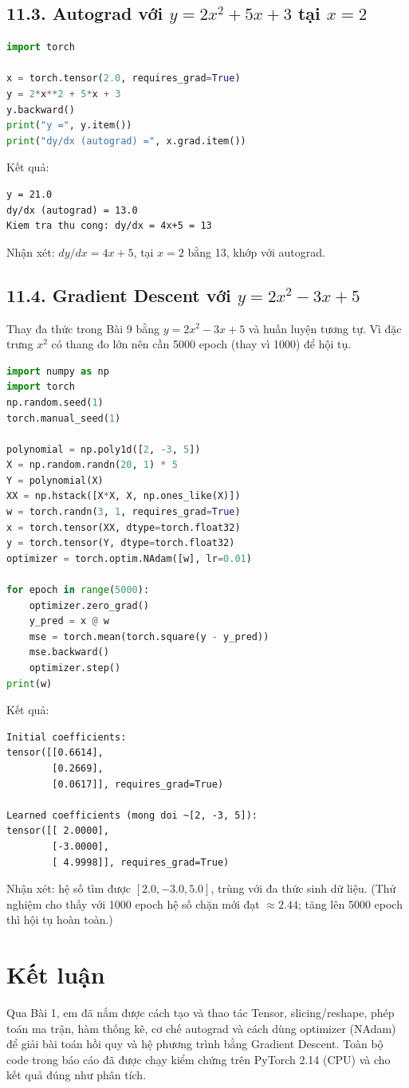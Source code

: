 \documentclass[a4paper,13pt]{article}
\begin{document}
\subsection{11.3. Autograd với $y=2x^2+5x+3$ tại $x=2$}
\begin{lstlisting}[language=Python]
import torch

x = torch.tensor(2.0, requires_grad=True)
y = 2*x**2 + 5*x + 3
y.backward()
print("y =", y.item())
print("dy/dx (autograd) =", x.grad.item())
\end{lstlisting}
Kết quả:
\begin{lstlisting}[backgroundcolor=\color{outgray}]
y = 21.0
dy/dx (autograd) = 13.0
Kiem tra thu cong: dy/dx = 4x+5 = 13
\end{lstlisting}
Nhận xét: $dy/dx=4x+5$, tại $x=2$ bằng 13, khớp với autograd.

\subsection{11.4. Gradient Descent với $y=2x^2-3x+5$}
Thay đa thức trong Bài 9 bằng $y=2x^2-3x+5$ và huấn luyện tương tự. Vì đặc trưng $x^2$ có thang đo lớn nên cần 5000 epoch (thay vì 1000) để hội tụ.
\begin{lstlisting}[language=Python]
import numpy as np
import torch
np.random.seed(1)
torch.manual_seed(1)

polynomial = np.poly1d([2, -3, 5])
X = np.random.randn(20, 1) * 5
Y = polynomial(X)
XX = np.hstack([X*X, X, np.ones_like(X)])
w = torch.randn(3, 1, requires_grad=True)
x = torch.tensor(XX, dtype=torch.float32)
y = torch.tensor(Y, dtype=torch.float32)
optimizer = torch.optim.NAdam([w], lr=0.01)

for epoch in range(5000):
    optimizer.zero_grad()
    y_pred = x @ w
    mse = torch.mean(torch.square(y - y_pred))
    mse.backward()
    optimizer.step()
print(w)
\end{lstlisting}
Kết quả:
\begin{lstlisting}[backgroundcolor=\color{outgray}]
Initial coefficients:
tensor([[0.6614],
        [0.2669],
        [0.0617]], requires_grad=True)

Learned coefficients (mong doi ~[2, -3, 5]):
tensor([[ 2.0000],
        [-3.0000],
        [ 4.9998]], requires_grad=True)
\end{lstlisting}
Nhận xét: hệ số tìm được $[2.0, -3.0, 5.0]$, trùng với đa thức sinh dữ liệu. (Thử nghiệm cho thấy với 1000 epoch hệ số chặn mới đạt $\approx 2.44$; tăng lên 5000 epoch thì hội tụ hoàn toàn.)

\newpage
\section{Kết luận}
Qua Bài 1, em đã nắm được cách tạo và thao tác Tensor, slicing/reshape, phép toán ma trận, hàm thống kê, cơ chế autograd và cách dùng optimizer (NAdam) để giải bài toán hồi quy và hệ phương trình bằng Gradient Descent. Toàn bộ code trong báo cáo đã được chạy kiểm chứng trên PyTorch 2.14 (CPU) và cho kết quả đúng như phân tích.
\end{document}
